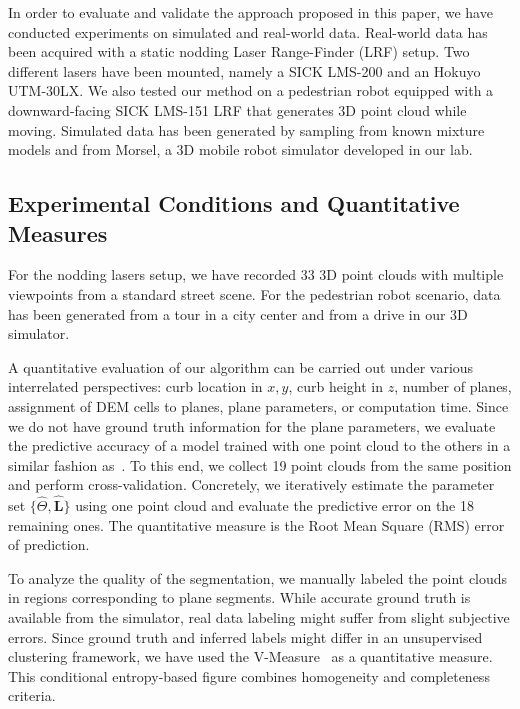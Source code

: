 In order to evaluate and validate the approach proposed in this paper, we have
conducted experiments on simulated and real-world data. Real-world data
has been acquired with a static nodding Laser Range-Finder (LRF) setup. Two
different lasers have been mounted, namely a SICK LMS-200 and an Hokuyo
UTM-30LX. We also tested our method on a pedestrian robot equipped with a
downward-facing SICK LMS-151 LRF that generates 3D point cloud while moving.
Simulated data has been generated by sampling from known mixture models and from
Morsel, a 3D mobile robot simulator developed in our lab.

\subsection{Experimental Conditions and Quantitative Measures}

For the nodding lasers setup, we have recorded 33 3D point clouds with multiple
viewpoints from a standard street scene. For the pedestrian robot scenario, data
has been generated from a tour in a city center and from a drive in our
3D simulator.

A quantitative evaluation of our algorithm can be carried out under various
interrelated perspectives: curb location in $x,y$, curb height in $z$,
number of planes, assignment of DEM cells to planes, plane parameters, or
computation time. Since we do not have ground truth information for the plane
parameters, we evaluate the predictive accuracy of a model trained
with one point cloud to the others in a similar fashion as~\cite{faria10fitting}.
To this end, we collect 19 point clouds from the same position and perform
cross-validation. Concretely, we iteratively estimate the parameter set
$\{\hat{\Theta},\mathbf{\hat{L}}\}$ using one point cloud and evaluate the
predictive error on the 18 remaining ones. The quantitative measure is the Root
Mean Square (RMS) error of prediction.



To analyze the quality of the segmentation, we manually labeled the point clouds
in regions corresponding to plane segments. While accurate ground truth is
available from the simulator, real data labeling might suffer from slight
subjective errors. Since ground truth and inferred labels might differ in an
unsupervised clustering framework, we have used the
V-Measure~\cite{rosenberg07vmeasure} as a quantitative measure. This conditional
entropy-based figure combines homogeneity and completeness criteria.

